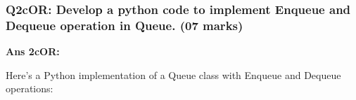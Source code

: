 \hypertarget{q2cor-develop-a-python-code-to-implement-enqueue-and-dequeue-operation-in-queue.-07-marks}{%
\subsubsection{Q2cOR: Develop a python code to implement Enqueue and
Dequeue operation in Queue. (07
marks)}\label{q2cor-develop-a-python-code-to-implement-enqueue-and-dequeue-operation-in-queue.-07-marks}}

\textbf{Ans 2cOR:}

Here's a Python implementation of a Queue class with Enqueue and Dequeue
operations:

\begin{Shaded}
\begin{Highlighting}[]
     \NormalTok{(}
        \OperatorTok{=}
        \OperatorTok{=}\NormalTok{ [}\NormalTok{] }\OperatorTok{*}
        \OperatorTok{=} \OperatorTok{=} \OperatorTok{{-}}
        \OperatorTok{=} 

    \NormalTok{):}
         \OperatorTok{==} 

    \NormalTok{):}
         \OperatorTok{==} 

         
            \NormalTok{(}

         
            \OperatorTok{=} \OperatorTok{=} 
        \NormalTok{:}
            \OperatorTok{=}\NormalTok{ (}\OperatorTok{+} \NormalTok{) }\OperatorTok{\%} 


\end{Highlighting}
\end{Shaded}
